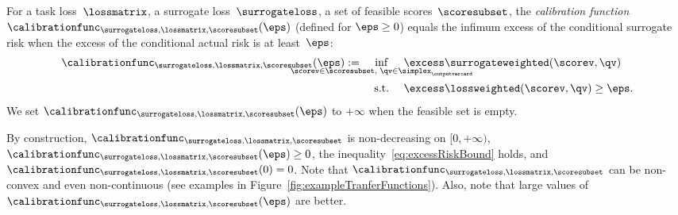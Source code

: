 \documentclass{article}
\begin{document}
\begin{definition}
\label{def:calibrationFunc}
For a task loss~$\lossmatrix$, a surrogate loss~$\surrogateloss$, a set of feasible scores~$\scoresubset$, the \emph{calibration function}~$\calibrationfunc_{\surrogateloss,\lossmatrix,\scoresubset}(\eps)$ (defined for $\eps \geq 0$) equals the infimum excess of the conditional surrogate risk when the excess of the conditional actual risk is at least~$\eps$:
\begin{align}
\label{eq:calibrationfunc}
\calibrationfunc_{\surrogateloss,\lossmatrix,\scoresubset}(\eps)
:=
\;\;\;\;
\inf_{\mathclap{\scorev \in \scoresubset, \;\qv \in \simplex_\outputvarcard}} \;&\;\;\;\;\excess\surrogateweighted(\scorev, \qv) \\
\label{eq:calibrationfunc:epsConstr}
\text{\textup{s.t.}} \:&\;\;\;\;\excess\lossweighted(\scorev, \qv) \geq \eps.
%
%
%
\end{align}
%
%
%
%
%
%
%
%
%
%
We set $\calibrationfunc_{\surrogateloss,\lossmatrix,\scoresubset}(\eps)$ to $+\infty$ when the feasible set is empty.
\end{definition}
By construction, $\calibrationfunc_{\surrogateloss,\lossmatrix,\scoresubset}$ is non-decreasing on $[0, +\infty)$, $\calibrationfunc_{\surrogateloss,\lossmatrix,\scoresubset}(\eps) \geq 0$, the inequality~\eqref{eq:excessRiskBound} holds, and $\calibrationfunc_{\surrogateloss,\lossmatrix,\scoresubset}(0) = 0$.
Note that $\calibrationfunc_{\surrogateloss,\lossmatrix,\scoresubset}$ can be non-convex and even non-continuous (see examples in Figure~\ref{fig:exampleTranferFunctions}). Also, note that large values of $\calibrationfunc_{\surrogateloss,\lossmatrix,\scoresubset}(\eps)$ are better.
\end{document}
